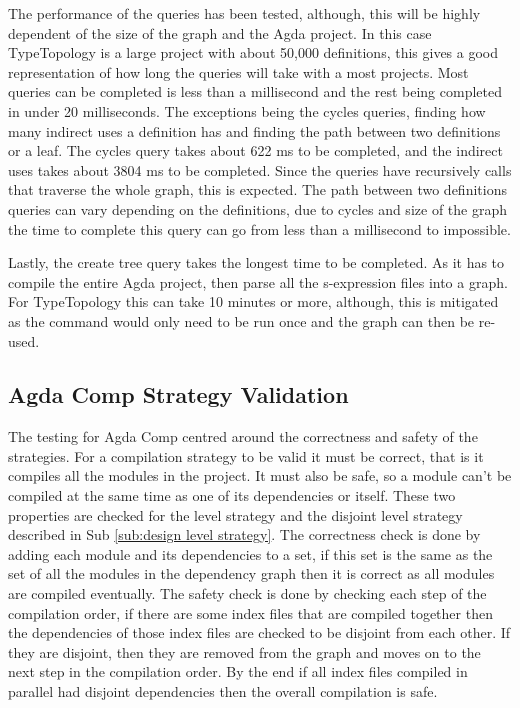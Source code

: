 The performance of the queries has been tested, although, this will be highly
dependent of the size of the graph and the Agda project. In this case
TypeTopology is a large project with about 50,000 definitions, this gives a
good representation of how long the queries will take with a most projects.
Most queries can be completed is less than a millisecond and the rest being
completed in under 20 milliseconds. The exceptions being the cycles queries,
finding how many indirect uses a definition has and finding the path between
two definitions or a leaf. The cycles query takes about 622 ms to be
completed, and the indirect uses takes about 3804 ms to be completed. Since the
queries have recursively calls that traverse the whole graph, this is expected.
The path between two definitions queries can vary depending on the definitions,
due to cycles and size of the graph the time to complete this query can go from
less than a millisecond to impossible.

Lastly, the create tree query takes the longest time to be completed. As it has
to compile the entire Agda project, then parse all the s-expression files into
a graph. For TypeTopology this can take 10 minutes or more, although, this is
mitigated as the command would only need to be run once and the graph can then
be re-used.

\subsection{Agda Comp Strategy Validation}

The testing for Agda Comp centred around the correctness and safety of the
strategies. For a compilation strategy to be valid it must be correct, that is
it compiles all the modules in the project. It must also be safe, so a module
can't be compiled at the same time as one of its dependencies or itself. These
two properties are checked for the level strategy and the disjoint level
strategy described in Sub \cref{sub:design level strategy}. The correctness check is done
by adding each module and its dependencies to a set, if this set is the same as
the set of all the modules in the dependency graph then it is correct as all
modules are compiled eventually. The safety check is done by checking each step
of the compilation order, if there are some index files that are compiled
together then the dependencies of those index files are checked to be disjoint
from each other. If they are disjoint, then they are removed from the graph and
moves on to the next step in the compilation order. By the end if all index
files compiled in parallel had disjoint dependencies then the overall
compilation is safe.

